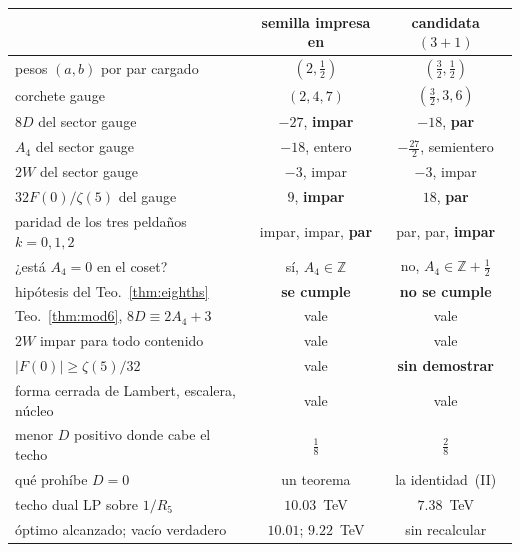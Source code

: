 \documentclass[11pt,a4paper]{article}
\newcommand{\ZZ}{\mathbb{Z}}
\begin{document}
\begin{itemize}
\begin{center}\footnotesize
{}
\begin{tabular}{lcc}
\toprule
\rowcolor{hdrblue!10} & semilla impresa en \cite{KM25} & candidata $(3{+}1)$ \\
\midrule
pesos $(a,b)$ por par cargado      & $(2,\tfrac12)$        & $(\tfrac32,\tfrac12)$ \\
corchete gauge                     & $(2,4,7)$             & $(\tfrac32,3,6)$ \\
$8D$ del sector gauge              & $-27$, \textbf{impar} & $-18$, \textbf{par} \\
$A_4$ del sector gauge             & $-18$, entero         & $-\tfrac{27}{2}$, semientero \\
$2W$ del sector gauge              & $-3$, impar           & $-3$, impar \\
$32F(0)/\zeta(5)$ del gauge        & $9$, \textbf{impar}   & $18$, \textbf{par} \\
paridad de los tres peldaños $k=0,1,2$ & impar, impar, \textbf{par} & par, par, \textbf{impar} \\
¿está $A_4=0$ en el coset?         & sí, $A_4\in\ZZ$      & no, $A_4\in\ZZ+\tfrac12$ \\
\midrule
\rowcolor{amber!14}hipótesis del Teo.~\ref{thm:eighths} & \textbf{se cumple}  & \textbf{no se cumple} \\
Teo.~\ref{thm:mod6}, $8D\equiv2A_4+3$ & vale               & vale \\
$2W$ impar para todo contenido     & vale                  & vale \\
\rowcolor{amber!14}$|F(0)|\ge\zeta(5)/32$             & vale                  & \textbf{sin demostrar} \\
forma cerrada de Lambert, escalera, núcleo & vale          & vale \\
\midrule
menor $D$ positivo donde cabe el techo & $\tfrac18$        & $\tfrac28$ \\
qué prohíbe $D=0$                  & un teorema            & la identidad~(II) \\
techo dual LP sobre $1/R_5$        & $10.03$~TeV           & $7.38$~TeV \\
óptimo alcanzado; vacío verdadero  & $10.01$; $9.22$~TeV   & sin recalcular \\
\bottomrule
\end{tabular}
\end{center}


\end{itemize}
\end{document}
